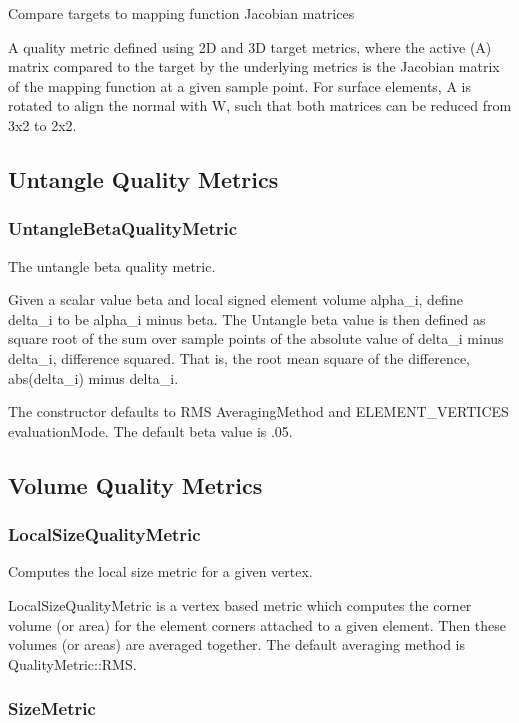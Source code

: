 Compare targets to mapping function Jacobian matrices

A quality metric defined using 2D and 3D target metrics, where the active (A) matrix compared to the target by the underlying metrics is the Jacobian matrix of the mapping function at a given sample point.  For surface elements, A is rotated to align the normal with W, such that both matrices can be reduced from 3x2 to 2x2.

\subsection{Untangle Quality Metrics}

\subsubsection{UntangleBetaQualityMetric}

  The untangle beta quality metric.
       
  Given a scalar value beta and local signed element volume alpha\_i, define delta\_i to be alpha\_i minus beta.  The Untangle beta value is then defined as square root of the sum over sample points of the absolute value of delta\_i minus delta\_i, difference squared. That is, the root mean square of the difference, abs(delta\_i) minus delta\_i.

The constructor defaults to RMS AveragingMethod and ELEMENT\_VERTICES evaluationMode.  The default beta value is .05.

\subsection{Volume Quality Metrics}

\subsubsection{LocalSizeQualityMetric}
       
  Computes the local size metric for a given vertex.
       
  LocalSizeQualityMetric is a vertex based metric which computes the corner volume (or area) for the element corners attached to a given element.  Then these volumes (or areas) are averaged together.  The default averaging method is QualityMetric::RMS. 

\subsubsection{SizeMetric}

